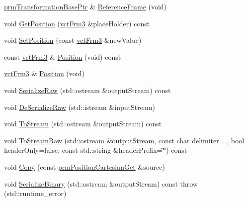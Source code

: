 \begin{DoxyCompactItemize}
\item 
\hyperlink{prm_transformation_base_8h_a881a6a7d2191474974cdf36d79e1df08}{prm\+Transformation\+Base\+Ptr} \& \hyperlink{classprm_position_cartesian_get_a1c5686f504916d1fb232e507da814e5d}{Reference\+Frame} (void)
\item 
void \hyperlink{classprm_position_cartesian_get_ad98a8838ac33b131ca955debad50900b}{Get\+Position} (\hyperlink{vct_transformation_types_8h_a81feda0a02c2d1bc26e5553f409fed20}{vct\+Frm3} \&place\+Holder) const 
\item 
void \hyperlink{classprm_position_cartesian_get_aef5db7a91ecc2becb507665a537bf64d}{Set\+Position} (const \hyperlink{vct_transformation_types_8h_a81feda0a02c2d1bc26e5553f409fed20}{vct\+Frm3} \&new\+Value)
\item 
const \hyperlink{vct_transformation_types_8h_a81feda0a02c2d1bc26e5553f409fed20}{vct\+Frm3} \& \hyperlink{classprm_position_cartesian_get_aa68a8c3bf694c2f1fef1ae3be6bde201}{Position} (void) const 
\item 
\hyperlink{vct_transformation_types_8h_a81feda0a02c2d1bc26e5553f409fed20}{vct\+Frm3} \& \hyperlink{classprm_position_cartesian_get_a2fb4d177c78b903fe1151449d6e939b8}{Position} (void)
\item 
void \hyperlink{classprm_position_cartesian_get_a519ae6a696101067e775381e76e32cdb}{Serialize\+Raw} (std\+::ostream \&output\+Stream) const 
\item 
void \hyperlink{classprm_position_cartesian_get_a6525c2d9f528757e00987ea0b9196084}{De\+Serialize\+Raw} (std\+::istream \&input\+Stream)
\item 
void \hyperlink{classprm_position_cartesian_get_a85b793084763652281e5d2225733620d}{To\+Stream} (std\+::ostream \&output\+Stream) const 
\item 
void \hyperlink{classprm_position_cartesian_get_a8ba57f6879b5d0ccde3e5d75f49a14d9}{To\+Stream\+Raw} (std\+::ostream \&output\+Stream, const char delimiter= \textquotesingle{} \textquotesingle{}, bool header\+Only=false, const std\+::string \&header\+Prefix=\char`\"{}\char`\"{}) const 
\item 
void \hyperlink{classprm_position_cartesian_get_adccc20c9cbf5941265ebad7fe9611ea5}{Copy} (const \hyperlink{classprm_position_cartesian_get}{prm\+Position\+Cartesian\+Get} \&source)
\item 
void \hyperlink{classprm_position_cartesian_get_af52918f55b5820b982baa394ac141071}{Serialize\+Binary} (std\+::ostream \&output\+Stream) const   throw (std\+::runtime\+\_\+error)
\item 

\end{DoxyCompactItemize}
